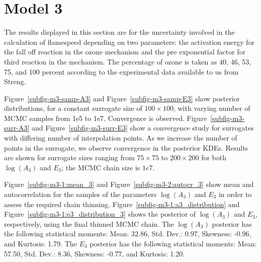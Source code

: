\section{Model 3}


The results displayed in this section are for the uncertainty involved
in the calculation of flamespeed depending on two parameters: the
activation energy for the fall off reaction in the ozone mechanism and
the pre exponential factor for third reaction in the mechanism. The
percentage of ozone is taken as 40, 46, 53, 75, and 100 percent
according to the experimental data available to us from
Streng\cite{Streng}.


Figure~\ref{subfig-m3-samp-A3} and
Figure~\ref{subfig-m3-samp-E3} show posterior distributions, for a constant surrogate size of
$100\times 100$, with varying number of MCMC samples from 1e5 to
1e7. Convergence is observed.
Figure~\ref{subfig-m3-surr-A3}
and Figure~\ref{subfig-m3-surr-E3} show a convergence
study for surrogates with differing number of interpolation
points. As we increase the number of points in the surrogate, we
observe convergence in the posterior KDEs. Results are shown for
surrogate sizes ranging from $75\times 75$ to $200\times 200$ for both
 $\log(A_3)$ and $E_3$; the MCMC chain
size is $1e7$.


Figure~\ref{subfig-m3-1:mean_3} and
Figure~\ref{subfig-m3-2:autocr_3} show mean and autocorrelation
for the samples of the parameters $\log(A_3)$ and $E_3$ in order to assess
the required chain thinning.
Figure~\ref{subfig-m3-1:a3_distribution} and
Figure~\ref{subfig-m3-1:e3_distribution_3}
shows the posterior of $\log(A_3)$ and $E_3$, respectively, using the
final thinned MCMC chain. The $\log(A_3)$ posterior has the following
statistical moments: Mean: 32.86, Std. Dev.: 0.97, Skewness: -0.96, and
Kurtosis: 1.79.  The $E_3$ posterior has the following statistical
moments:
Mean: 57.50, Std. Dev.: 8.36, Skewness: -0.77, and
Kurtosis: 1.20.


